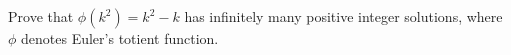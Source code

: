 Prove that $\phi(k^2)=k^2-k$ has infinitely many positive integer solutions, where $\phi$ denotes Euler's totient function.
